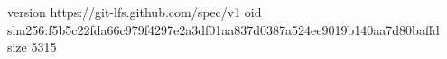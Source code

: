 version https://git-lfs.github.com/spec/v1
oid sha256:f5b5c22fda66c979f4297e2a3df01aa837d0387a524ee9019b140aa7d80baffd
size 5315
